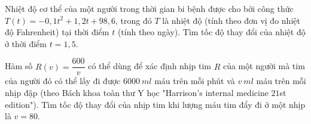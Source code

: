 \begin{bt}%
	Nhiệt độ cơ thể của một người trong thời gian bi bệnh được cho bởi công thức $T(t)=-0,1t^2+1,2t+98,6$, trong đó $T$ là nhiệt độ (tính theo đơn vị đo nhiệt độ Fahrenheit) tại thời điểm $t$ (tính theo ngày). Tìm tốc độ thay đổi của nhiệt độ ở thời điểm $t=1,5$.
\end{bt}
\begin{bt}%
	Hàm số $R(v)=\dfrac{600}{v}$ có thể dùng để xác định nhịp tim $R$ của một người mà tim của người đó có thể lấy đi được $6000~ml$ máu trên mỗi phút và $v~ml$ máu trên mỗi nhịp đập (theo Bách khoa toàn thư Y học "Harrison's internal medicine $21$st edition"). Tìm tốc độ thay đổi của nhịp tim khi lượng máu tim đẩy đi ở một nhịp là $v=80$.
\end{bt}	